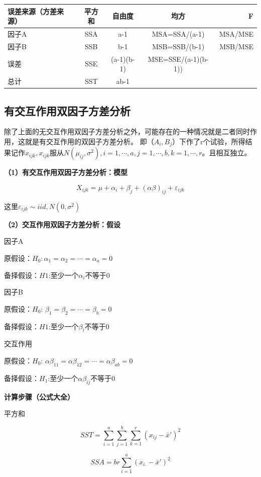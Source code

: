 \documentclass[]{ctexbook}
\begin{document}
\begin{longtable}[]{@{}lcccr@{}}
\toprule
误差来源（方差来源） & 平方和 & 自由度 & 均方 & F\tabularnewline
\midrule
\endhead
因子A & SSA & a-1 & MSA=SSA/(a-1) & MSA/MSE\tabularnewline
因子B & SSB & b-1 & MSB=SSB/(b-1) & MSB/MSE\tabularnewline
误差 & SSE & (a-1)(b-1) & MSE=SSE/(a-1)(b-1)) &\tabularnewline
总计 & SST & ab-1 & &\tabularnewline
\bottomrule
\end{longtable}

\hypertarget{ux6709ux4ea4ux4e92ux4f5cux7528ux53ccux56e0ux5b50ux65b9ux5deeux5206ux6790}{%
\subsection{有交互作用双因子方差分析}\label{ux6709ux4ea4ux4e92ux4f5cux7528ux53ccux56e0ux5b50ux65b9ux5deeux5206ux6790}}

除了上面的无交互作用双因子方差分析之外，可能存在的一种情况就是二者同时作用，这就是有交互作用的双因子方差分析。
即（\(A_i,B_j\)）下作了r个试验，所得结果记作\(x_{ijk},x_{ijk}\)服从\(N(\mu_{ij},\sigma^2),i=1,\cdots,a,j=1,\cdots,b,k=1,\cdots,r\)。且相互独立。

\textbf{（1）有交互作用双因子方差分析：模型}

\[X_{ijk}=\mu+\alpha_i+\beta_j+(\alpha\beta)_{ij}+\varepsilon_{ijk}\]

这里\(\varepsilon_{ijk}\sim iid,N(0,\sigma^2)\)

\textbf{（2）交互作用双因子方差分析：假设}

因子A

原假设：\(H_0:\alpha_1= \alpha_2=\cdots= \alpha_a=0\)

备择假设：\(H1\):至少一个\(\alpha_i\)不等于0

因子B

原假设：\(H_0\): \(\beta_1 = \beta_2 = \cdots = \beta_b=0\)

备择假设：\(H1\):至少一个\(\beta_i\)不等于0

交互作用

原假设：\(H_0\): \(\alpha\beta_{11} = \alpha\beta_{12} = \cdots = \alpha\beta_{ab}=0\)

备择假设：\(H_1\):至少一个\(\alpha\beta_{ij}\)不等于0

\textbf{计算步骤（公式大全）}

平方和

\[SST=\sum_{i=1}^a\sum_{j=1}^b\sum_{k=1}^r(x_{ij}-\bar x')^2\]

\[SSA=br\sum_{i=1}^a(x_{i.}-\bar x')^2\]
\end{document}
